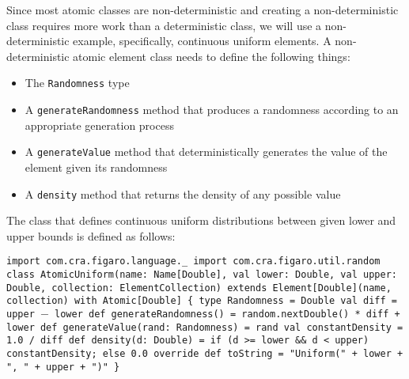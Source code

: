 Since most atomic classes are non-deterministic and creating a non-deterministic class requires more work than a deterministic class, we will use a non-deterministic example, specifically, continuous uniform elements. A non-deterministic atomic element class needs to define the following things:

\begin{itemize}
\item The \texttt{Randomness} type
\item A \texttt{generateRandomness} method that produces a randomness according to an appropriate generation process
\item A \texttt{generateValue} method that deterministically generates the value of the element given its randomness
\item A \texttt{density} method that returns the density of any possible value
\end{itemize}

The class that defines continuous uniform distributions between given lower and upper bounds is defined as follows:

\begin{flushleft}
\texttt{import com.cra.figaro.language.\_
\newline import com.cra.figaro.util.random
\newline 
\newline class AtomicUniform(name: Name[Double], val lower: Double, val upper: Double, collection: ElementCollection)
\newline extends Element[Double](name, collection) with
Atomic[Double] \{
\newline \tab type Randomness = Double 
\newline \tab val diff = upper $-$ lower
\newline 
\newline \tab def generateRandomness() = random.nextDouble() * diff + lower 
\newline \tab def generateValue(rand: Randomness) = rand
\newline 
\newline \tab val constantDensity = 1.0 / diff
\newline 
\newline \tab def density(d: Double) = if (d >= lower \&\& d < upper)
\newline \tab constantDensity; else 0.0
\newline 
\newline \tab override def toString = "Uniform(" + lower + ", " + upper + ")"
\newline \}
}
\end{flushleft}

